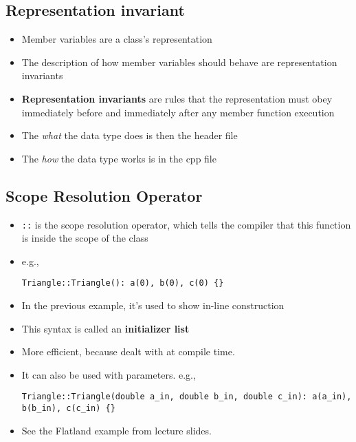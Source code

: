 \subsection{Representation invariant}
\begin{itemize}
	\item Member variables are a class’s representation
	\item The description of how member variables should behave are representation invariants
	\item \textbf{Representation invariants} are rules that the representation must obey immediately before and immediately after any member function execution
	\item The \textit{what} the data type does is then the header file
	\item The \textit{how} the data type works is in the cpp file
\end{itemize}

\subsection{Scope Resolution Operator}
\begin{itemize}
	\item \lstinline[style=C++]{::} is the scope resolution operator, which tells the compiler that this function is inside the scope of the class
	\item e.g.,
\begin{lstlisting}[style=C++]
Triangle::Triangle(): a(0), b(0), c(0) {}
\end{lstlisting}
	\item In the previous example, it's used to show in-line construction
	\item This syntax is called an \textbf{initializer list}
	\item More efficient, because dealt with at compile time.
	\item It can also be used with parameters. e.g.,
\begin{lstlisting}[style=C++]
Triangle::Triangle(double a_in, double b_in, double c_in): a(a_in), b(b_in), c(c_in) {}
\end{lstlisting}
	\item See the Flatland example from lecture slides.
\end{itemize}